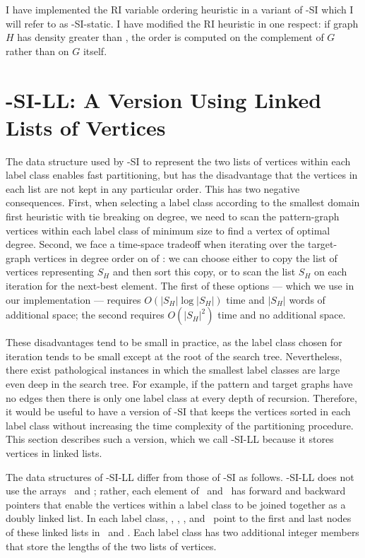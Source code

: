 I have implemented the RI variable ordering heuristic in a variant of \McSplit-SI
which I will refer to as \McSplit-SI-static.  I have modified the RI heuristic
in one respect: if graph $H$ has density greater than , the order
is computed on the complement of $G$ rather than on $G$ itself.

\section{\McSplit-SI-LL: A Version Using Linked Lists of Vertices}\label{sec:mcsplit-si-ll}

The data structure used by \McSplit-SI to represent the two lists of vertices
within each label class enables fast partitioning, but has the disadvantage
that the vertices in each list are not kept in any particular order.  This has
two negative consequences.  First, when selecting a label class according to
the smallest domain first heuristic with tie breaking on degree, we need to
scan the pattern-graph vertices within each label class of minimum size to find
a vertex of optimal degree.  Second, we face a time-space tradeoff when
iterating over the target-graph vertices in degree order on
 of : we can choose either to copy
the list of vertices representing $S_H$ and then sort this copy, or to scan the
list $S_H$ on each iteration for the next-best element.  The first of these
options --- which we use in our implementation --- requires $O(|S_H| \log
|S_H|)$ time and $|S_H|$ words of additional space; the second requires
$O(|S_H|^2)$ time and no additional space.

These disadvantages tend to be small in practice, as the label class chosen for
iteration tends to be small except at the root of the search tree.
Nevertheless, there exist pathological instances in which the smallest label
classes are large even deep in the search tree.  For example, if the pattern
and target graphs have no edges then there is only one label class at every
depth of recursion.  Therefore, it would be useful to have a version of
\McSplit-SI that keeps the vertices sorted in each label class without increasing
the time complexity of the partitioning procedure.  This section describes
such a version, which we call \McSplit-SI-LL because it stores
vertices in linked lists.

The data structures of \McSplit-SI-LL differ from those of \McSplit-SI as
follows.  \McSplit-SI-LL does not use the arrays \Garray\ and \Harray; rather,
each element of \Gptrs\ and \Hptrs\ has forward and backward pointers that
enable the vertices within a label class to be joined together as a doubly
linked list.  In each label class, \varStartG, \varEndG, \varStartH, and
\varEndH\ point to the first and last nodes of these linked lists in \Gptrs\
and \Hptrs.  Each label class has two additional integer members that store the
lengths of the two lists of vertices.

